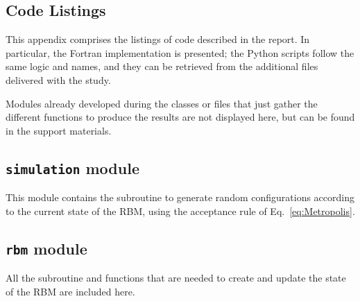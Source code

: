 \documentclass[a4paper,11pt]{article}
\begin{document}
\begin{appendices}
\section{Code Listings}
\label{appendix:code}

This appendix comprises the listings of code described in the report. In particular, the Fortran implementation is presented; the Python scripts follow the same logic and names, and they can be retrieved from the additional files delivered with the study.

Modules already developed during the classes or files that just gather the different functions to produce the results are not displayed here, but can be found in the support materials.

\subsection{\texttt{simulation} module}

This module contains the subroutine to generate random configurations according to the current state of the RBM, using the acceptance rule of Eq.~\ref{eq:Metropolis}.



\subsection{\texttt{rbm} module}

All the subroutine and functions that are needed to create and update the state of the RBM are included here.








\end{appendices}
\end{document}
